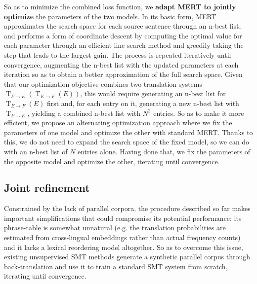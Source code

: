 \documentclass[11pt,a4paper]{article}
\DeclareMathOperator{\translate}{T}
\begin{document}
So as to minimize the combined loss function, we \textbf{adapt MERT to jointly optimize} the parameters of the two models. In its basic form, MERT approximates the search space for each source sentence through an n-best list, and performs a form of coordinate descent by computing the optimal value for each parameter through an efficient line search method and greedily taking the step that leads to the largest gain. The process is repeated iteratively until convergence, augmenting the n-best list with the updated parameters at each iteration so as to obtain a better approximation of the full search space.
Given that our optimization objective combines two translation systems $\translate_{F \rightarrow E} ( \translate_{E \rightarrow F} (E))$, this would require generating an n-best list for $\translate_{E \rightarrow F} (E)$ first and, for each entry on it, generating a new n-best list with $\translate_{F \rightarrow E}$, yielding a combined n-best list with $N^2$ entries. So as to make it more efficient, we propose an alternating optimization approach where we fix the parameters of one model and optimize the other with standard MERT. Thanks to this, we do not need to expand the search space of the fixed model, so we can do with an n-best list of $N$ entries alone. Having done that, we fix the parameters of the opposite model and optimize the other, iterating until convergence.


\subsection{Joint refinement} \label{subsec:refinement}

Constrained by the lack of parallel corpora, the procedure described so far makes important simplifications that could compromise its potential performance: its phrase-table is somewhat unnatural (e.g. the translation probabilities are estimated from cross-lingual embeddings rather than actual frequency counts) and it lacks a lexical reordering model altogether. So as to overcome this issue, existing unsupervised SMT methods generate a synthetic parallel corpus through back-translation and use it to train a standard SMT system from scratch, iterating until convergence.
\end{document}
